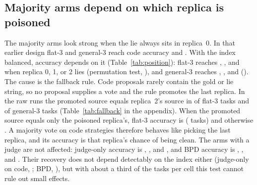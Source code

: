 \documentclass[11pt]{article}
\begin{document}
\subsection{Majority arms depend on which replica is poisoned}
\label{sec:position}


The majority arms look strong when the lie always sits in replica~0.
In that earlier design flat-3 and general-3 reach code accuracy \RateBSixRFlatThreeCodeAcc{} and \RateBSixRGenThreeCodeAcc{}.
With the index balanced, accuracy depends on it (Table~\ref{tab:position}): flat-3 reaches \RatePosBSevenFlatThreeCodeAccZero{}, \RatePosBSevenFlatThreeCodeAccOne{}, and \RatePosBSevenFlatThreeCodeAccTwo{} when replica 0, 1, or 2 lies (permutation test, \PvalPosBSevenFlatThreeCodeAcc{}), and general-3 reaches \RatePosBSevenGenThreeCodeAccZero{}, \RatePosBSevenGenThreeCodeAccOne{}, and \RatePosBSevenGenThreeCodeAccTwo{} (\PvalPosBSevenGenThreeCodeAcc{}).
The cause is the fallback rule. Code proposals rarely contain the gold or lie string, so no proposal supplies a vote and the rule promotes the last replica.
In the raw runs the promoted source equals replica~2's source in \RateFbMainFlatThreeCodeLast{} of flat-3 tasks and \RateFbMainGenThreeCodeLast{} of general-3 tasks (Table~\ref{tab:fallback} in the appendix).
When the promoted source equals only the poisoned replica's, flat-3 accuracy is \RateFbMainFlatThreeCodeAccPoisonedOnly{} (\CountFbMainFlatThreeCodePoisonedOnly{} tasks) and otherwise \RateFbMainFlatThreeCodeAccOther{}.
A majority vote on code strategies therefore behaves like picking the last replica, and its accuracy is that replica's chance of being clean.
The arms with a judge are not affected: judge-only accuracy is \RatePosBSevenJudgeOnlyCodeAccZero{}, \RatePosBSevenJudgeOnlyCodeAccOne{}, and \RatePosBSevenJudgeOnlyCodeAccTwo{}, and BPD accuracy is \RatePosBSevenBpdCodeAccZero{}, \RatePosBSevenBpdCodeAccOne{}, and \RatePosBSevenBpdCodeAccTwo{}.
Their recovery does not depend detectably on the index either (judge-only on code, \PvalPosBSevenJudgeOnlyCodeRec{}; BPD, \PvalPosBSevenBpdCodeRec{}), but with about a third of the tasks per cell this test cannot rule out small effects.
\end{document}
